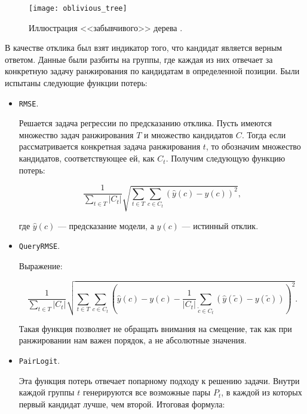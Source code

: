 \begin{center}
	\begin{figure}[h!]
		\texttt{[image: oblivious\_tree]}\centering
		\caption{Иллюстрация <<забывчивого>> дерева \cite{CatBoostDocs}.}
		\label{ris:oblivious_tree}
	\end{figure}
\end{center}

В качестве отклика был взят индикатор того, что кандидат является верным ответом. Данные были разбиты на группы, где каждая из них отвечает за конкретную задачу ранжирования по кандидатам в определенной позиции. Были испытаны следующие функции потерь:

\begin{itemize}
	\item \verb|RMSE|.
	
	Решается задача регрессии по предсказанию отклика. Пусть имеются множество задач ранжирования $T$ и множество кандидатов $C$. Тогда если рассматривается конкретная задача ранжирования $t$, то обозначим множество кандидатов, соответствующее ей, как $C_t$. Получим следующую функцию потерь:
	
	\begin{equation*}
		\frac{1}{\sum\limits_{t \in T} |C_t|} \sqrt{\sum\limits_{t \in T} \sum\limits_{c \in C_t} \left( \widehat{y}(c) - y(c) \right)^2}, 
	\end{equation*}
	
	где $\widehat{y}(c)$ --- предсказание модели, а $y(c)$ --- истинный отклик.
	
	\item \verb|QueryRMSE|.
	
	Выражение:
	
	\begin{equation*}
		\frac{1}{\sum\limits_{t \in T} |C_t|} \sqrt{\sum\limits_{t \in T} \sum\limits_{c \in C_t} \left( \widehat{y}(c) - y(c) - \frac{1}{|C_t|} \sum\limits_{\tilde{c} \in C_t} \left( \widehat{y}(\tilde{c}) - y(\tilde{c}) \right) \right)^2}.
	\end{equation*}
	
	Такая функция позволяет не обращать внимания на смещение, так как при ранжировании нам важен порядок, а не абсолютные значения.
	
	\item \verb|PairLogit|.
	
	Эта функция потерь отвечает попарному подходу к решению задачи. Внутри каждой группы $t$ генерируются все возможные пары $P_t$, в каждой из которых первый кандидат лучше, чем второй. Итоговая формула:
	

\end{itemize}
